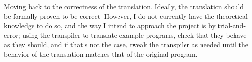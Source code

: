 \documentclass[11pt]{article}
\begin{document}
Moving back to the correctness of the translation. Ideally, the translation
should be formally proven to be correct. However, I do not currently have
the theoretical knowledge to do so, and the way I intend to approach
the project is by trial-and-error; using the transpiler to translate example programs,
check that they behave as they should, and if that's not the case, tweak the
transpiler as needed until the behavior of the translation matches that
of the original program.

\printbibliography
\end{document}
